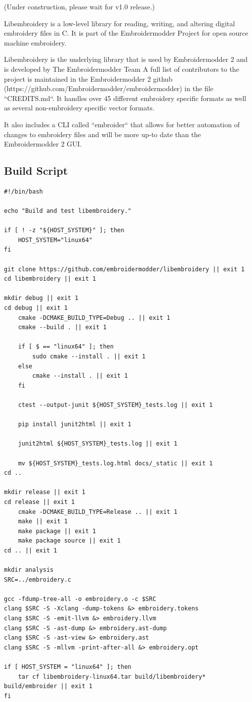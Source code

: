 \documentclass[11pt]{report}
\begin{document}
(Under construction, please wait for v1.0 release.)

Libembroidery is a low-level library for reading, writing,
and altering digital embroidery files in C. It is part of the Embroidermodder Project
for open source machine embroidery.

Libembroidery is the underlying library that is used by Embroidermodder 2
and is developed by  The Embroidermodder Team %
A full list of contributors to the project is maintained in
the Embroidermodder 2 github (https://github.com/Embroidermodder/embroidermodder)
in the file ``CREDITS.md``. It handles over 45 different embroidery specific formats as well
as several non-embroidery specific vector formats.

It also includes a CLI called ``embroider`` that allows for better automation of
changes to embroidery files and will be more up-to date than
the Embroidermodder 2 GUI.

\subsection{Build Script}

\begin{lstlisting}
#!/bin/bash

echo "Build and test libembroidery."

if [ ! -z "${HOST_SYSTEM}" ]; then
    HOST_SYSTEM="linux64"
fi

git clone https://github.com/embroidermodder/libembroidery || exit 1
cd libembroidery || exit 1

mkdir debug || exit 1
cd debug || exit 1
    cmake -DCMAKE_BUILD_TYPE=Debug .. || exit 1
    cmake --build . || exit 1

    if [ $ == "linux64" ]; then
	    sudo cmake --install . || exit 1
    else
        cmake --install . || exit 1
    fi

    ctest --output-junit ${HOST_SYSTEM}_tests.log || exit 1

    pip install junit2html || exit 1

    junit2html ${HOST_SYSTEM}_tests.log || exit 1

    mv ${HOST_SYSTEM}_tests.log.html docs/_static || exit 1
cd ..

mkdir release || exit 1
cd release || exit 1
    cmake -DCMAKE_BUILD_TYPE=Release .. || exit 1
    make || exit 1
    make package || exit 1
    make package source || exit 1
cd .. || exit 1

mkdir analysis
SRC=../embroidery.c

gcc -fdump-tree-all -o embroidery.o -c $SRC
clang $SRC -S -Xclang -dump-tokens &> embroidery.tokens
clang $SRC -S -emit-llvm &> embroidery.llvm
clang $SRC -S -ast-dump &> embroidery.ast-dump
clang $SRC -S -ast-view &> embroidery.ast
clang $SRC -S -mllvm -print-after-all &> embroidery.opt

if [ HOST_SYSTEM = "linux64" ]; then
    tar cf libembroidery-linux64.tar build/libembroidery* build/embroider || exit 1
fi
\end{lstlisting}
\end{document}
